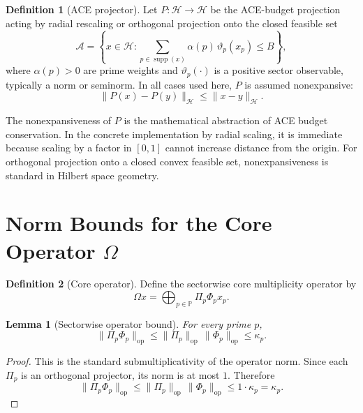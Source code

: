 \documentclass[12pt,a4paper]{article}
\theoremstyle{definition}
\newtheorem{definition}{Definition}[section]
\theoremstyle{plain}
\newtheorem{lemma}[theorem]{Lemma}
\theoremstyle{remark}
\begin{document}
\begin{definition}[ACE projector]
Let $P : \mathcal{H} \to \mathcal{H}$ be the ACE-budget projection acting by
radial rescaling or orthogonal projection onto the closed feasible set
\begin{equation}
\mathcal{A} = \left\{x\in\mathcal{H} : \sum_{p\in\operatorname{supp}(x)}
\alpha(p)\,\vartheta_p(x_p) \le B\right\},
\end{equation}
where $\alpha(p) > 0$ are prime weights and $\vartheta_p(\cdot)$ is a positive
sector observable, typically a norm or seminorm. In all cases used here,
$P$ is assumed nonexpansive:
\begin{equation}
\|P(x)-P(y)\|_{\mathcal{H}} \le \|x-y\|_{\mathcal{H}}.
\end{equation}
\end{definition}

\begin{invariantbox}
The nonexpansiveness of $P$ is the mathematical abstraction of ACE budget
conservation. In the concrete implementation by radial scaling, it is immediate
because scaling by a factor in $[0,1]$ cannot increase distance from the origin.
For orthogonal projection onto a closed convex feasible set, nonexpansiveness is
standard in Hilbert space geometry.
\end{invariantbox}

\section{Norm Bounds for the Core Operator $\Omega$}

\begin{definition}[Core operator]
Define the sectorwise core multiplicity operator by
\begin{equation}
\Omega x = \bigoplus_{p\in\mathbb{P}} \Pi_p \Phi_p x_p.
\end{equation}
\end{definition}

\begin{lemma}[Sectorwise operator bound]
For every prime $p$,
\begin{equation}
\|\Pi_p \Phi_p\|_{\mathrm{op}} \le \|\Pi_p\|_{\mathrm{op}}\,\|\Phi_p\|_{\mathrm{op}}
\le \kappa_p.
\end{equation}
\end{lemma}

\begin{proof}
This is the standard submultiplicativity of the operator norm. Since each
$\Pi_p$ is an orthogonal projector, its norm is at most $1$. Therefore
\begin{equation}
\|\Pi_p\Phi_p\|_{\mathrm{op}} \le \|\Pi_p\|_{\mathrm{op}}\,\|\Phi_p\|_{\mathrm{op}}
\le 1\cdot \kappa_p = \kappa_p.
\end{equation}
\end{proof}
\end{document}
